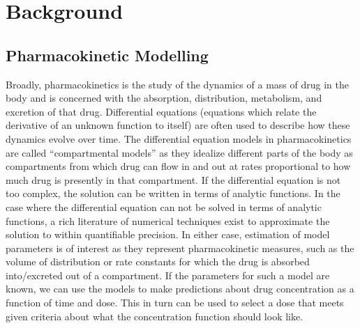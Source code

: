 \section{Background}
\subsection*{Pharmacokinetic Modelling}

Broadly, pharmacokinetics is the study of the dynamics of a mass of drug in the body and is concerned with the absorption, distribution, metabolism, and excretion of that drug.  Differential equations (equations which relate the derivative of an unknown function to itself) are often used to describe how these dynamics evolve over time. The differential equation models in pharmacokinetics are called “compartmental models” as they idealize different parts of the body as compartments from which drug can flow in and out at rates proportional to how much drug is presently in that compartment. If the differential equation is not too complex, the solution can be written in terms of analytic functions.  In the case where the differential equation can not be solved in terms of analytic functions, a rich literature of numerical techniques exist to approximate the solution to within quantifiable precision. In either case, estimation of model parameters is of  interest as they represent pharmacokinetic measures, such as the volume of distribution or rate constants for which the drug is absorbed into/excreted out of a compartment. If the parameters for such a model are known, we can use the models to make predictions about drug concentration as a function of time and dose. This in turn can be used to select a dose that meets given criteria about what the concentration function should look like.

